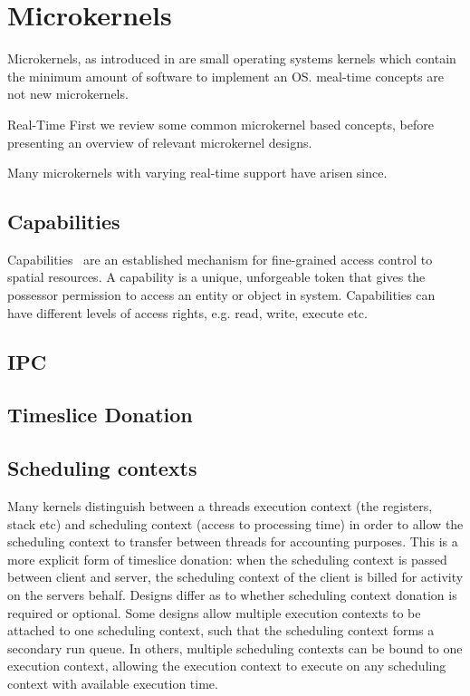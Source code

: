 
\section{Microkernels}

Microkernels, as introduced in  are small operating systems kernels which contain the minimum amount of software to
implement an OS. 
meal-time concepts are not new microkernels.

Real-Time
First we review some common microkernel based concepts, before presenting an overview of relevant microkernel designs.


Many microkernels with varying real-time support have arisen since.


\subsection{Capabilities}
\label{s:capabilities}

Capabilities~\citep{Dennis_VanHorn_66} are an established mechanism for fine-grained access control
to spatial resources. A capability is a unique, unforgeable token that gives the possessor
permission to access an entity or object in system. Capabilities can have different levels of access
rights, e.g. read, write, execute etc.

\subsection{IPC}


\subsection{Timeslice Donation}




\subsection{Scheduling contexts}

Many kernels distinguish between a threads execution context (the registers, stack etc) and scheduling context (access to processing time) in order to allow the scheduling context to transfer between threads for accounting purposes.
This is a more explicit form of timeslice donation: when the scheduling context is passed between client and server, the scheduling context of the client is billed for activity on the servers behalf. 
Designs differ as to whether scheduling context donation is required or optional. 
Some designs allow multiple execution contexts to be attached to one scheduling context, such that the scheduling context forms a secondary run queue. 
In others, multiple scheduling contexts can be bound to one execution context, allowing the execution context to execute on any scheduling context with available execution time. 


